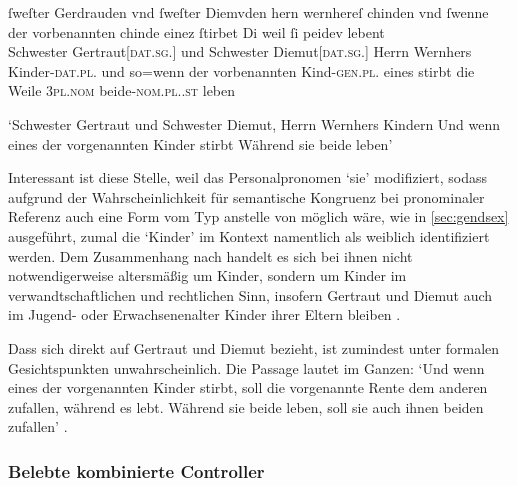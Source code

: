 \begin{exe}
\ex \label{ex:f+f_kindesibeidiu}
	\gll ſweſter Gerdrauden vnd ſweſter Diemvden hern wernhereſ
			chinden \textelp{} vnd ſwenne der vorbenannten
			chinde einez ſtirbet \textelp{} Di weil ſi
			peidev lebent \\
		Schwester Gertraut[\textsc{dat.sg.\FemF}] und Schwester Diemut[\textsc{dat.sg.\FemF}]
			Herrn Wernhers Kinder-\textsc{dat.pl.\NeutF} {} und so=wenn der
			vorbenannten Kind-\textsc{gen.pl.\NeutF} eines stirbt {} die Weile
			\textsc{3pl\subF.nom} beide-\textsc{nom.pl.\NeutF.st} leben \\
	\begin{taggedline}{\parencites(Engelthal, Kr.~Nürnberger Land, 1298)[\pno~2960, 240.31--38]{cao4}}
	\trans `Schwester Gertraut und Schwester Diemut, Herrn Wernhers
		Kindern \textelp{} Und wenn eines der vorgenannten Kinder stirbt
		\textelp{} Während sie beide leben'
	\end{taggedline}
\end{exe}

Interessant ist diese Stelle, weil  das Personalpronomen
 `sie' modifiziert, sodass aufgrund der Wahrscheinlichkeit für
semantische Kongruenz bei pronominaler Referenz auch eine Form vom Typ
 anstelle von  möglich wäre, wie in \cref{sec:gendsex}
ausgeführt, zumal die  `Kinder' im Kontext namentlich als
weiblich identifiziert werden. Dem Zusammenhang nach handelt es sich bei ihnen
nicht notwendigerweise altersmäßig um Kinder, sondern um Kinder im
verwandt\-schaft\-lichen und rechtlichen Sinn, insofern Gertraut und Diemut
auch im Jugend- oder Erwachsenen\-alter Kinder ihrer Eltern bleiben
\autocites[\pno~2960, 240.31, 35]{cao4}[vgl.~auch][\pno~2719]{cao4}[569,
619]{caor}.

Dass sich  direkt auf Gertraut und Diemut bezieht, ist
zumindest unter formalen Gesichtspunkten unwahrscheinlich. Die Passage lautet
im Ganzen:  `Und wenn eines der vorgenannten Kinder
stirbt, soll die vorgenannte Rente dem anderen zufallen, während es lebt.
Während sie beide leben, soll sie auch ihnen beiden zufallen'
\autocite[\pno~2960, 240.37--39]{cao4}.

\subsubsection{Belebte kombinierte Controller}

